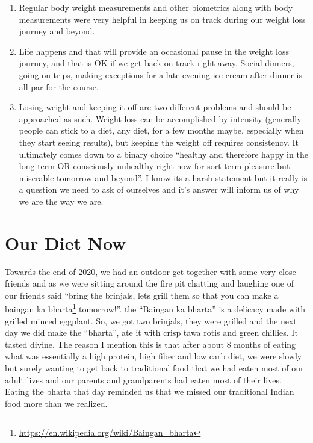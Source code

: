 \documentclass[
  oneside]{book}
\DeclareRobustCommand{\href}[2]{#2\footnote{\url{#1}}}
\begin{document}
\begin{enumerate}
\def\labelenumi{\arabic{enumi}.}
\item
  Regular body weight measurements and other biometrics along with body measurements were very helpful in keeping us on track during our weight loss journey and beyond.
\item
  Life happens and that will provide an occasional pause in the weight loss journey, and that is OK if we get back on track right away. Social dinners, going on trips, making exceptions for a late evening ice-cream after dinner is all par for the course.
\item
  Losing weight and keeping it off are two different problems and should be approached as such. Weight loss can be accomplished by intensity (generally people can stick to a diet, any diet, for a few months maybe, especially when they start seeing results), but keeping the weight off requires consistency. It ultimately comes down to a binary choice ``healthy and therefore happy in the long term OR consciously unhealthy right now for sort term pleasure but miserable tomorrow and beyond''. I know its a harsh statement but it really is a question we need to ask of ourselves and it's answer will inform us of why we are the way we are.
\end{enumerate}

\hypertarget{our-diet-now}{%
\chapter{Our Diet Now}\label{our-diet-now}}

Towards the end of 2020, we had an outdoor get together with some very close friends and as we were sitting around the fire pit chatting and laughing one of our friends said ``bring the brinjals, lets grill them so that you can make a \href{https://en.wikipedia.org/wiki/Baingan_bharta}{baingan ka bharta} tomorrow!''. the ``Baingan ka bharta'' is a delicacy made with grilled minced eggplant. So, we got two brinjals, they were grilled and the next day we did make the ``bharta'', ate it with crisp tawa rotis and green chillies. It tasted divine. The reason I mention this is that after about 8 months of eating what was essentially a high protein, high fiber and low carb diet, we were slowly but surely wanting to get back to traditional food that we had eaten most of our adult lives and our parents and grandparents had eaten most of their lives. Eating the bharta that day reminded us that we missed our traditional Indian food more than we realized.
\end{document}
